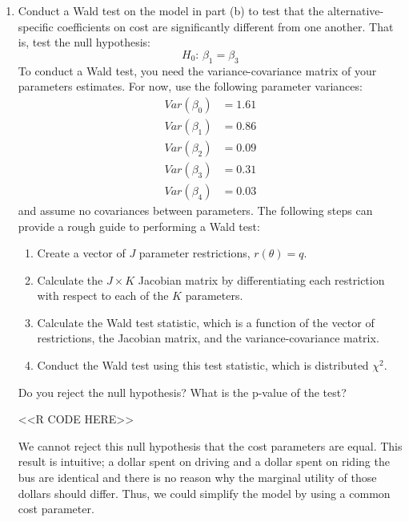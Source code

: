 \documentclass[11pt,letterpaper]{article}
\begin{document}
\begin{enumerate}[label=\alph*., leftmargin=*]
	\item Conduct a Wald test on the model in part (b) to test that the alternative-specific coefficients on cost are significantly different from one another. That is, test the null hypothesis:
	$$H_0 \text{: } \beta_1 = \beta_3$$
	To conduct a Wald test, you need the variance-covariance matrix of your parameters estimates. For now, use the following parameter variances:
	\begin{align*}
		Var(\beta_0) &= 1.61 \\
		Var(\beta_1) &= 0.86 \\
		Var(\beta_2) &= 0.09 \\
		Var(\beta_3) &= 0.31 \\
		Var(\beta_4) &= 0.03
	\end{align*}
	and assume no covariances between parameters. The following steps can provide a rough guide to performing a Wald test:
	\begin{enumerate}[label=\Roman*.]
		\item Create a vector of $J$ parameter restrictions, $r(\theta) = q$.
		\item Calculate the $J \times K$ Jacobian matrix by differentiating each restriction with respect to each of the $K$ parameters.
		\item Calculate the Wald test statistic, which is a function of the vector of restrictions, the Jacobian matrix, and the variance-covariance matrix.
		\item Conduct the Wald test using this test statistic, which is distributed $\chi^2$.
	\end{enumerate}
	Do you reject the null hypothesis? What is the p-value of the test?

	<<R CODE HERE>>

	We cannot reject this null hypothesis that the cost parameters are equal. This result is intuitive; a dollar spent on driving and a dollar spent on riding the bus are identical and there is no reason why the marginal utility of those dollars should differ. Thus, we could simplify the model by using a common cost parameter.


\end{enumerate}
\end{document}
